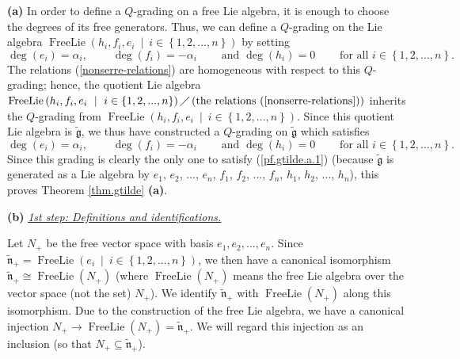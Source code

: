 \documentclass[etingof-lie.tex]{subfiles}
\begin{document}
\bigskip

\textbf{(a)} In order to define a $Q$-grading on a free Lie algebra, it is
enough to choose the degrees of its free generators. Thus, we can define a
$Q$-grading on the Lie algebra $\operatorname*{FreeLie}\left(  h_{i}%
,f_{i},e_{i}\ \mid\ i\in\left\{  1,2,...,n\right\}  \right)  $ by setting%
\[
\deg\left(  e_{i}\right)  =\alpha_{i},\ \ \ \ \ \ \ \ \ \ \deg\left(
f_{i}\right)  =-\alpha_{i}\ \ \ \ \ \ \ \ \ \ \text{and }\deg\left(
h_{i}\right)  =0\ \ \ \ \ \ \ \ \ \ \text{for all }i\in\left\{
1,2,...,n\right\}  .
\]
The relations (\ref{nonserre-relations}) are homogeneous with respect to this
$Q$-grading; hence, the quotient Lie algebra $\operatorname*{FreeLie}\left(
h_{i},f_{i},e_{i}\ \mid\ i\in\left\{  1,2,...,n\right\}  \right)
\diagup\left(  \text{the relations (\ref{nonserre-relations})}\right)  $
inherits the $Q$-grading from $\operatorname*{FreeLie}\left(  h_{i}%
,f_{i},e_{i}\ \mid\ i\in\left\{  1,2,...,n\right\}  \right)  $. Since this
quotient Lie algebra is $\widetilde{\mathfrak{g}}$, we thus have constructed a
$Q$-grading on $\widetilde{\mathfrak{g}}$ which satisfies%
\begin{equation}
\deg\left(  e_{i}\right)  =\alpha_{i},\ \ \ \ \ \ \ \ \ \ \deg\left(
f_{i}\right)  =-\alpha_{i}\ \ \ \ \ \ \ \ \ \ \text{and }\deg\left(
h_{i}\right)  =0\ \ \ \ \ \ \ \ \ \ \text{for all }i\in\left\{
1,2,...,n\right\}  . \label{pf.gtilde.a.1}%
\end{equation}
Since this grading is clearly the only one to satisfy (\ref{pf.gtilde.a.1})
(because $\widetilde{\mathfrak{g}}$ is generated as a Lie algebra by $e_{1}$,
$e_{2}$, $...$, $e_{n}$, $f_{1}$, $f_{2}$, $...$, $f_{n}$, $h_{1}$, $h_{2}$,
$...$, $h_{n}$), this proves Theorem \ref{thm.gtilde} \textbf{(a)}.

\bigskip

\textbf{(b)} \underline{\textit{1st step: Definitions and identifications.}}

Let $N_{+}$ be the free vector space with basis $e_{1},e_{2},...,e_{n}$. Since
$\widetilde{\mathfrak{n}}_{+}=\operatorname*{FreeLie}\left(  e_{i}\ \mid
\ i\in\left\{  1,2,...,n\right\}  \right)  $, we then have a canonical
isomorphism $\widetilde{\mathfrak{n}}_{+}\cong\operatorname*{FreeLie}\left(
N_{+}\right)  $ (where $\operatorname*{FreeLie}\left(  N_{+}\right)  $ means
the free Lie algebra over the vector space (not the set) $N_{+}$). We identify
$\widetilde{\mathfrak{n}}_{+}$ with $\operatorname*{FreeLie}\left(
N_{+}\right)  $ along this isomorphism. Due to the construction of the free
Lie algebra, we have a canonical injection $N_{+}\rightarrow
\operatorname*{FreeLie}\left(  N_{+}\right)  =\widetilde{\mathfrak{n}}_{+}$.
We will regard this injection as an inclusion (so that $N_{+}\subseteq
\widetilde{\mathfrak{n}}_{+}$).
\end{document}

